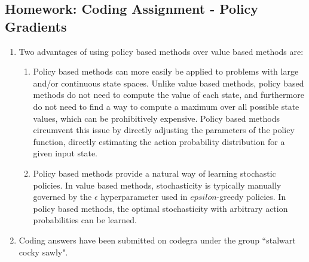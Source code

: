 \documentclass{article}
\begin{document}
\subsection{Homework: Coding Assignment - Policy Gradients}
\begin{enumerate}
	\item Two advantages of using policy based methods over value based methods are:
	      \begin{enumerate}
		      \item Policy based methods can more easily be applied to problems with large and/or
		            continuous state spaces. Unlike value based methods, policy based methods do not
		            need to compute the value of each state, and furthermore do not need to find a way
		            to compute a maximum over all possible state values, which can be prohibitively
		            expensive. Policy based methods circumvent this issue by directly adjusting the
		            parameters of the policy function, directly estimating the action probability
		            distribution for a given input state.
		      \item Policy based methods provide a natural way of learning stochastic policies. In value
		            based methods, stochasticity is typically manually governed by the $\epsilon$
		            hyperparameter used in $epsilon$-greedy policies. In policy based methods, the optimal
		            stochasticity with arbitrary action probabilities can be learned.
	      \end{enumerate}
	\item Coding answers have been submitted on codegra under the group ``stalwart cocky sawly".
\end{enumerate}

\setcounter{section}{10}
\setcounter{subsection}{2}
\end{document}
